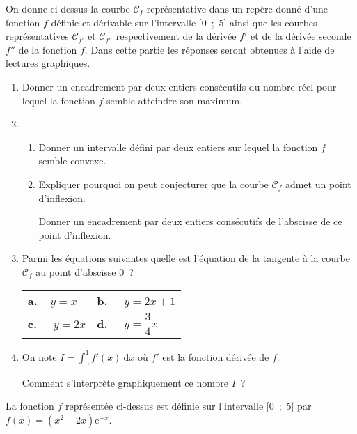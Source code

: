 \medbreak
On donne ci-dessus la courbe $\mathscr{C}_f$ représentative dans un repère donné d'une fonction $f$ définie
et dérivable sur l'intervalle [0~;~5] ainsi que les courbes représentatives $\mathscr{C}_{f'}$ et $\mathscr{C}_{f''}$ respectivement
de la dérivée $f'$ et de la dérivée seconde $f''$ de la fonction $f$.
\medbreak
{}
\medbreak
Dans cette partie les réponses seront obtenues à l'aide de lectures graphiques.
\medbreak
\begin{enumerate}
     \item Donner un encadrement par deux entiers consécutifs du nombre réel pour lequel la
     fonction $f$ semble atteindre son maximum.
     \item
     \begin{enumerate}[label=\alph*.]
          \item Donner un intervalle défini par deux entiers sur lequel la fonction $f$ semble convexe.
          \item Expliquer pourquoi on peut conjecturer que la courbe $\mathscr{C}_f$ admet un point d'inflexion.
          \par
          Donner un encadrement par deux entiers consécutifs de l'abscisse de ce point d'inflexion.
     \end{enumerate}
     \item Parmi les équations suivantes quelle est l'équation de la tangente à la courbe $\mathscr{C}_f$ au point d'abscisse $0$~?

          \begin{tabularx}{\linewidth}{XX}%
               \textbf{a.~~}$y=x$&\textbf{b.~~} $y = 2x+ 1$\\
               \textbf{c.~~} $y= 2x$&\textbf{d.~~} $y= \dfrac{3}{4}x$\\
          \end{tabularx}

     \item On note $I = \displaystyle\int_0^1 f'(x)\:\text{d}x$ où $f'$ est la fonction dérivée de $f$.
     \par
     Comment s'interprète graphiquement ce nombre $I$~?
\end{enumerate}
\bigbreak
{}
\medbreak
La fonction $f$ représentée ci-dessus est définie sur l'intervalle [0~;~5] par $f(x) = \left(x^2 + 2x\right)\text{e}^{-x}$.
\medbreak
